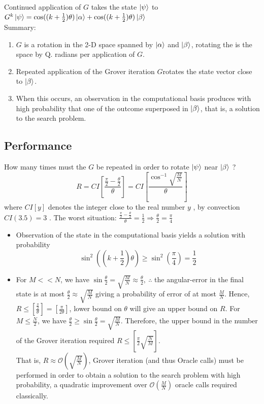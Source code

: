 \documentclass[]{book}
\theoremstyle{nonumberplain}
\begin{document}
Continued application of $G$ takes the state $\ket{\psi}$ to $G^k\ket{\psi} = \cos((k+\frac{1}{2})\theta)\ket{\alpha} + \cos((k+\frac{1}{2})\theta)\ket{\beta}$\\

Summary:
\begin{enumerate}
    \item $G$ is a rotation in the 2-D space spanned by $\ket{\alpha}$ and $\ket{\beta}$, rotating the is the space by Q. radians per application of $G$.
    \item Repeated application of the Grover iteration $G$rotates the state vector close to $\ket{\beta}$.
    \item When this occurs, an observation in the computational basis produces with high probability that one of the outcome superposed in $\ket{\beta}$, that is, a solution to the search problem. 
\end{enumerate}

\subsection{Performance}
How many times must the $G$ be repeated in order to rotate $\ket{\psi}$ near $\ket{\beta}$ ?
\[
    R = CI\left[\frac{\frac{\pi}{2}-\frac{\theta}{2}}{\theta}\right] = CI\left[\frac{\cos^{-1}\sqrt{\frac{M}{N}}}{\theta}\right]
\]
where $CI\left[y\right]$ denotes the integer close to the real number $y$ , by convection $CI(3.5)=3$ . The worst situation: $\frac{\frac{\pi}{2}-\frac{\theta}{2}}{\theta}=\frac{1}{2} \Rightarrow \frac{\theta}{2} = \frac{\pi}{4}$

\begin{itemize}
    \item Observation of the  state in the computational basis yields a solution with probability 
    \[
        \sin^{2}\left(\left(k+\frac{1}{2}\right)\theta\right) \geq \sin^{2}\left(\frac{\pi}{4}\right) = \frac{1}{2}
    \]
    \item For $M << N$, we have $\sin{\frac{\theta}{2}=\sqrt{\frac{M}{N}}} \approx \frac{\theta}{2}, \ \therefore$ the angular-error in the final state is at most $\frac{\theta}{2} \approx \sqrt{\frac{M}{N}}$ giving a probability of error of at most $\frac{M}{N}$. Hence, $R \leq \left[\frac{\frac{\pi}{2}}{\theta}\right]=\left[\frac{\pi}{2\theta}\right]$, lower bound on $\theta$ will give an upper bound on $R$. For $M \leq \frac{N}{2}$, we have $\frac{\theta}{2} \geq \sin{\frac{\theta}{2}} = \sqrt{\frac{M}{N}}$.
    Therefore, the upper bound in the number of the Grover iteration required $R \leq \left[\frac{\pi}{2}\sqrt{\frac{N}{M}}\right]$.\\
    That is, $R\approx \mathcal{O}(\sqrt{\frac{M}{N}})$, Grover iteration (and thus Oracle calls) must be performed in order to obtain a solution to the search problem with high probability, a quadratic improvement over $\mathcal{O}(\frac{M}{N})$ oracle calls required classically.
\end{itemize}
\end{document}
